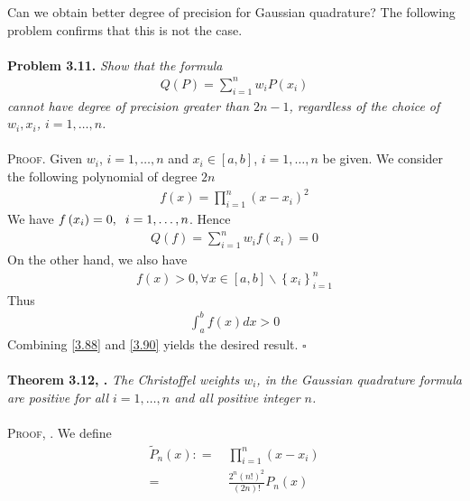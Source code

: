 \documentclass[a4paper]{article}
\numberwithin{equation}{section}
\begin{document}
Can we obtain better degree of precision for Gaussian quadrature? The following problem confirms that this is not the case.\\
\\
\textbf{Problem 3.11.} \textit{Show that the formula}
\begin{align}
Q\left( P \right) = \sum\limits_{i = 1}^n {{w_i}P\left( {{x_i}} \right)} 
\end{align}
\textit{cannot have degree of precision greater than $2n-1$, regardless of the choice of $w_i,x_i$, $i=1,\ldots,n$.}\\
\\
\textsc{Proof.} Given $w_i$, $i=1,\ldots,n$ and $x_i \in \left[a,b\right]$, $i=1,\ldots,n$ be given. We consider the following polynomial of degree $2n$
\begin{align}
f\left( x \right) = \prod\limits_{i = 1}^n {{{\left( {x - {x_i}} \right)}^2}} 
\end{align}
We have $f\left( {{x_i}} \right) = 0,\hspace{0.2cm} i = 1, \ldots ,n$. Hence
\begin{align}
\label{3.88}
Q\left( f \right) = \sum\limits_{i = 1}^n {{w_i}f\left( {{x_i}} \right)} = 0
\end{align}
On the other hand, we also have
\begin{align}
f\left( x \right) > 0,\forall x \in \left[ {a,b} \right]\backslash \left\{ {{x_i}} \right\}_{i = 1}^n
\end{align}
Thus
\begin{align}
\label{3.90}
\int_a^b {f\left( x \right)dx}  > 0
\end{align}
Combining \eqref{3.88} and \eqref{3.90} yields the desired result. \hfill $\square$\\
\\
\textbf{Theorem 3.12, \cite{6}.} \textit{The Christoffel weights $w_i$, in the Gaussian quadrature formula are positive for all $i=1,\ldots,n$ and all positive integer $n$.}\\
\\
\textsc{Proof, \cite{6}.} We define 
\begin{align}
{\widetilde P_n}\left( x \right): =&\ \prod\limits_{i = 1}^n {\left( {x - {x_i}} \right)} \\
=&\ \frac{{{2^n}{{\left( {n!} \right)}^2}}}{{\left( {2n} \right)!}}{P_n}\left( x \right) \label{3.92}
\end{align}
\end{document}
